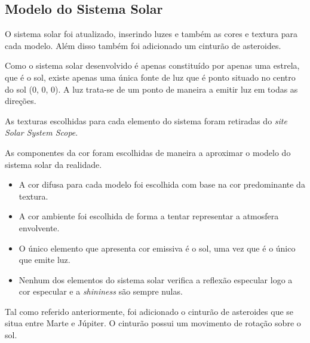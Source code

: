 \documentclass[relatorio.tex]{subfiles}
\begin{document}
    
\subsection{Modelo do Sistema Solar} \label{subsec:sistema_solar}

O sistema solar foi atualizado, inserindo luzes e também as cores
e textura para cada modelo. Além disso também foi adicionado um 
cinturão de asteroides.

Como o sistema solar desenvolvido é apenas constituído por apenas uma estrela, que é
o sol, existe apenas uma única fonte de luz que é ponto situado no centro do sol (0, 0, 0). A 
luz trata-se de um ponto de maneira a emitir luz em todas as direções.

As texturas escolhidas para cada elemento do sistema foram retiradas do \textit{site Solar System Scope}.

As componentes da cor foram escolhidas de maneira a aproximar o modelo do sistema solar da realidade. 
\begin{itemize}
    \item A cor difusa para cada modelo foi escolhida com base na cor predominante da textura.
    \item A cor ambiente foi escolhida de forma a tentar representar a atmosfera envolvente.
    \item O único elemento que apresenta cor emissiva é o sol, uma vez que é o único que emite luz.
    \item Nenhum dos elementos do sistema solar verifica a reflexão especular logo a cor especular
    e a \textit{shininess} são sempre nulas.
\end{itemize}

Tal como referido anteriormente, foi adicionado o cinturão de asteroides que se situa entre Marte e 
Júpiter. O cinturão possui um movimento de rotação sobre o sol.
\end{document}
